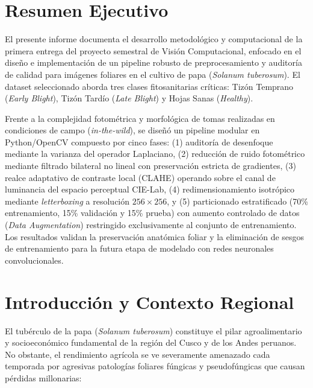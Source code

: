 \documentclass[12pt,a4paper]{article}
\begin{document}
\section*{Resumen Ejecutivo}
El presente informe documenta el desarrollo metodológico y computacional de la primera entrega del proyecto semestral de Visión Computacional, enfocado en el diseño e implementación de un pipeline robusto de preprocesamiento y auditoría de calidad para imágenes foliares en el cultivo de papa (\textit{Solanum tuberosum}). El dataset seleccionado aborda tres clases fitosanitarias críticas: Tizón Temprano (\textit{Early Blight}), Tizón Tardío (\textit{Late Blight}) y Hojas Sanas (\textit{Healthy}). 

Frente a la complejidad fotométrica y morfológica de tomas realizadas en condiciones de campo (\textit{in-the-wild}), se diseñó un pipeline modular en Python/OpenCV compuesto por cinco fases: (1) auditoría de desenfoque mediante la varianza del operador Laplaciano, (2) reducción de ruido fotométrico mediante filtrado bilateral no lineal con preservación estricta de gradientes, (3) realce adaptativo de contraste local (CLAHE) operando sobre el canal de luminancia del espacio perceptual CIE-Lab, (4) redimensionamiento isotrópico mediante \textit{letterboxing} a resolución $256 \times 256$, y (5) particionado estratificado (70\% entrenamiento, 15\% validación y 15\% prueba) con aumento controlado de datos (\textit{Data Augmentation}) restringido exclusivamente al conjunto de entrenamiento. Los resultados validan la preservación anatómica foliar y la eliminación de sesgos de entrenamiento para la futura etapa de modelado con redes neuronales convolucionales.

\newpage
\tableofcontents
\newpage

\section{Introducción y Contexto Regional}

El tubérculo de la papa (\textit{Solanum tuberosum}) constituye el pilar agroalimentario y socioeconómico fundamental de la región del Cusco y de los Andes peruanos. No obstante, el rendimiento agrícola se ve severamente amenazado cada temporada por agresivas patologías foliares fúngicas y pseudofúngicas que causan pérdidas millonarias:
\end{document}
